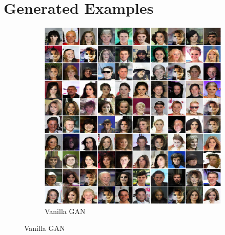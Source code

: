 \documentclass[table]{article}
\begin{document}
\newpage



\newpage
\appendix
\section{Generated Examples}
\begin{figure}[ht]
  \centering
  \begin{subfigure}{\textwidth}
    \centering
    \includegraphics[scale=0.38]{imgs/gan_epoch50}
    \caption{Vanilla GAN}
  \end{subfigure}


\end{figure}
\end{document}
